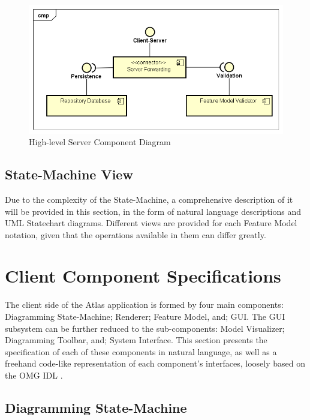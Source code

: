 \begin{figure}[ht]
    \centering
        \includegraphics[scale=0.6]{figures/Server.png}
	\caption{High-level Server Component Diagram}
	\label{fig_server}
\end{figure}


\subsection{State-Machine View}

Due to the complexity of the State-Machine, a comprehensive description of it will be provided in this section, in the form of natural language descriptions and UML Statechart diagrams. Different views are provided for each Feature Model notation, given that the operations available in them can differ greatly.


\section{Client Component Specifications}

The client side of the Atlas application is formed by four main components: Diagramming State-Machine; Renderer; Feature Model, and; GUI. The GUI subsystem can be further reduced to the sub-components: Model Visualizer; Diagramming Toolbar, and; System Interface. This section presents the specification of each of these components in natural language, as well as a freehand code-like representation of each component's interfaces, loosely based on the OMG IDL \cite{OMG:2014}.


\subsection{Diagramming State-Machine}

